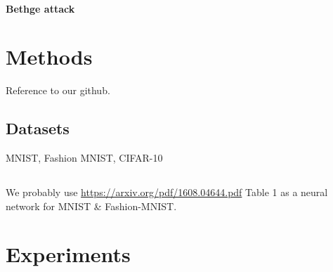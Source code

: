 \documentclass{article}
\begin{document}
\paragraph{Bethge attack}

%
%
%


\section{Methods}

Reference to our github.

\subsection{Datasets}
MNIST, Fashion MNIST, CIFAR-10

\subsection{}
We probably use \url{https://arxiv.org/pdf/1608.04644.pdf} Table 1 as a neural network for MNIST \& Fashion-MNIST.

\section{Experiments}
\label{experiments}
\end{document}
